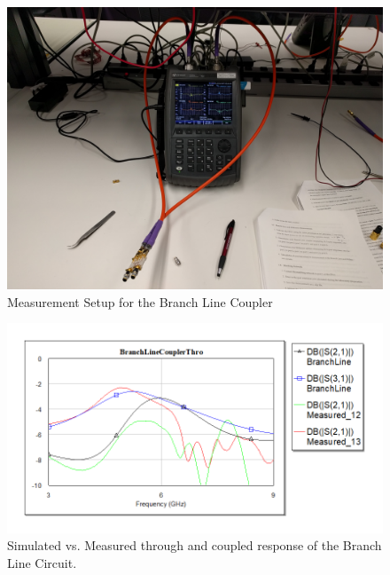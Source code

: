 \documentclass[twocolumn, aps, apl]{revtex4-1}
\begin{document}
\begin{figure}[!htbp]
    \centering
    \includegraphics[scale=0.05]{BranchImg.jpg}
    \caption{Measurement Setup for the Branch Line Coupler}
    \label{fig:branchimg}
\end{figure}

\begin{figure}[!htbp]
    \centering
    \includegraphics[scale=0.4]{BranchThro.png}
    \caption{Simulated vs. Measured through and coupled response of the Branch Line Circuit. }
    \label{fig:branchthro}
\end{figure}
\end{document}
